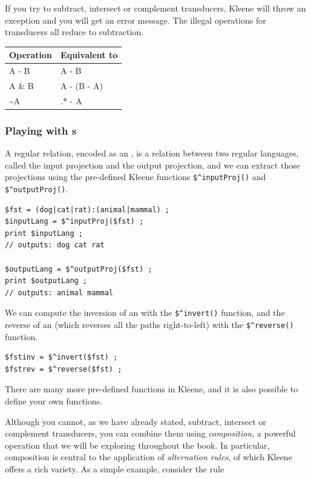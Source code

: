 \vspace{4mm}

\noindent
If you try to subtract, intersect or complement transducers, Kleene will
throw an exception and you will get an error message.
The illegal operations for transducers all reduce to subtraction.

\vspace{4mm}

\begin{tabular}{|l|l|}
\hline
Operation & Equivalent to \\
\hline
A - B  &  A - B \\
A \& B  &  A - (B - A)\\
\~{}A   &  .* - A\\
\hline
\end{tabular}

\subsubsection{Playing with \fst{}s}

A regular relation, encoded as an \fst{}, is a relation between two regular languages,
called the input projection and the output projection, and we can extract those
projections using the pre-defined Kleene functions \verb!$^inputProj()!
and \verb!$^outputProj()!.


\begin{Verbatim}
$fst = (dog|cat|rat):(animal|mammal) ;
$inputLang = $^inputProj($fst) ;
print $inputLang ;
// outputs: dog cat rat

$outputLang = $^outputProj($fst) ;
print $outputLang ;
// outputs: animal mammal
\end{Verbatim}

We can compute the inversion of an \fst{} with the \verb!$^invert()!
function, and the reverse of an \fsm{} (which reverses all the paths right-to-left)
with the \verb!$^reverse()! function.


\begin{Verbatim}
$fstinv = $^invert($fst) ;
$fstrev = $^reverse($fst) ;
\end{Verbatim}

\noindent
There are many more pre-defined functions in Kleene, and it is also possible to define your own functions.

Although you cannot, as we have already stated, subtract, intersect or complement
transducers, you can combine them using \emph{composition}, a powerful operation that we
will be exploring throughout the book.
In particular, composition is central to the application of \emph{alternation rules}, of
which Kleene offers a rich variety.  As a simple example, consider the rule

